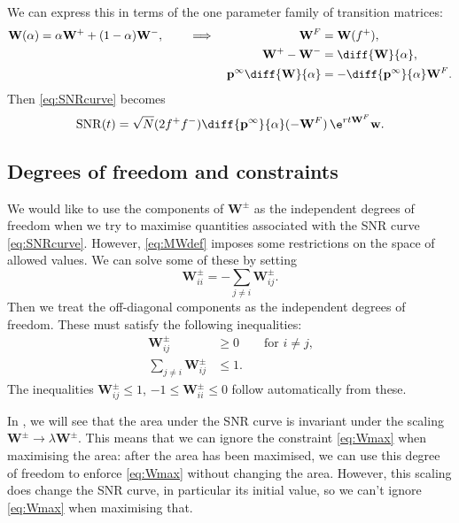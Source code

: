 \documentclass[12pt]{article}
\newcommand{\eq}{\mathbf{p}^\infty}
\newcommand{\w}{\mathbf{w}}
\newcommand{\W}{\mathbf{W}}
\DeclareMathOperator{\SNR}{SNR}
\begin{document}
We can express this in terms of the one parameter family of transition matrices:
%
\begin{equation}\label{eq:Walpha}
  \begin{aligned}
  \W(\alpha) &= \alpha\W^++(1-\alpha)\W^-,
  &\quad&\implies&
    \W^F&=\W(f^+),\\&&&&
    \W^+ - \W^- &= \diff{\W}{\alpha},\\&&&&
    \eq \diff{\W}{\alpha} &= -\diff{\eq}{\alpha} \W^F.
  \end{aligned}
\end{equation}
%
Then \eqref{eq:SNRcurve} becomes
%
\begin{equation}\label{eq:SNRalpha}
  \SNR(t) = \sqrt{N} (2f^+f^-) \diff{\eq}{\alpha}(-\W^F)\,\e^{rt\W^F}\w.
\end{equation}
%



\subsection{Degrees of freedom and constraints}\label{sec:constraints}

We would like to use the components of $\W^\pm$ as the independent degrees of freedom when we try to maximise quantities associated with the SNR curve \eqref{eq:SNRcurve}.
However, \eqref{eq:MWdef} imposes some restrictions on the space of allowed values.
We can solve some of these by setting
%
\begin{equation}\label{eq:Wdiag}
  \W^\pm_{ii} = -\sum_{j\neq i} \W^\pm_{ij}.
\end{equation}
%
Then we treat the off-diagonal components as the independent degrees of freedom.
These must satisfy the following inequalities:
%
\begin{align}\label{eq:Wmin}
  \W^\pm_{ij} &\geq 0 \qquad \text{for $i \neq j$,}\\
\label{eq:Wmax}
  \sum_{j \neq i} \W^\pm_{ij} &\leq 1.
\end{align}
%
The inequalities $\W^\pm_{ij} \leq 1$, $-1\leq\W^\pm_{ii}\leq0$ follow automatically from these.

In , we will see that the area under the SNR curve is invariant under the scaling $\W^\pm\to\lambda\W^\pm$.
This means that we can ignore the constraint \eqref{eq:Wmax} when maximising the area:
after the area has been maximised, we can use this degree of freedom to enforce \eqref{eq:Wmax} without changing the area.
However, this scaling does change the SNR curve, in particular its initial value, so we can't ignore \eqref{eq:Wmax} when maximising that.
\end{document}

